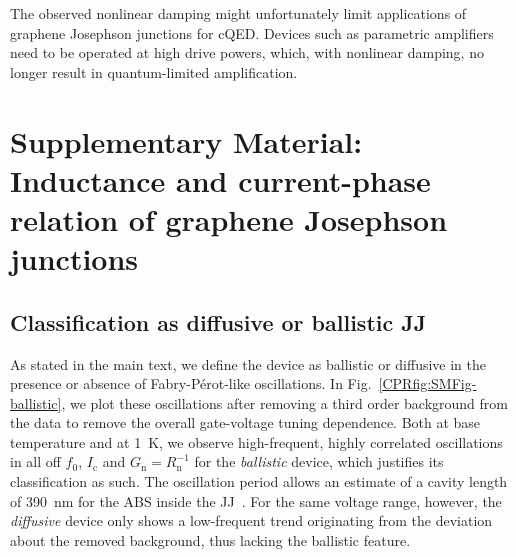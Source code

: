 The observed nonlinear damping might unfortunately limit applications of graphene Josephson junctions for cQED.
%
Devices such as parametric amplifiers need to be operated at high drive powers, which, with nonlinear damping, no longer result in quantum-limited amplification.

%


\clearpage
\pagebreak




\section{Supplementary Material: Inductance and current-phase relation of graphene Josephson junctions}\label{sec:SM}

\subsection{Classification as diffusive or ballistic JJ}\label{sec:SMballistic}

As stated in the main text, we define the device as ballistic or diffusive in the presence or absence of Fabry-Pérot-like oscillations.
%
In Fig.~\ref{CPRfig:SMFig-ballistic}, we plot these oscillations after removing a third order background from the data to remove the overall gate-voltage tuning dependence.
%
Both at base temperature and at \SI{1}{\kelvin}, we observe high-frequent, highly correlated oscillations in all off $f_0$, $I_\text{c}$ and $G_\text{n}=R_\text{n}^{-1}$ for the \textit{ballistic} device, which justifies its classification as such.
%
The oscillation period allows an estimate of a cavity length of \SI{390}{\nano\meter} for the ABS inside the JJ~\cite{schmidtBallisticGrapheneSuperconducting2018}.
%
For the same voltage range, however, the \textit{diffusive} device only shows a low-frequent trend originating from the deviation about the removed background, thus lacking the ballistic feature.

